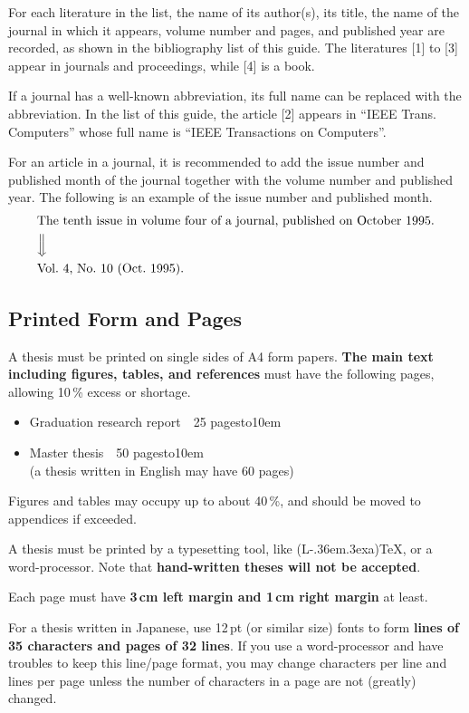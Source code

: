 \documentclass[master,english]{kuisthesis}
\def\LATEX{{\rm (L\kern-.36em\raise.3ex\hbox{\sc a})\TeX}}
\let\EM\bf
\begin{document}
For each literature in the list, the name of its author(s), its title, the
name of the journal in which it appears, volume number and pages, and
published year are recorded, as shown in the bibliography list of this guide.
The literatures [1] to [3] appear in journals and proceedings, while [4] is
a book.

If a journal has a well-known abbreviation, its full name can be replaced
with the abbreviation.  In the list of this guide, the article [2]
appears in ``IEEE Trans. Computers'' whose full name is ``IEEE Transactions
on Computers''.

For an article in a journal, it is recommended to add the issue number and
published month of the journal together with the volume number and published
year.  The following is an example of the issue number and published month.
\begin{eqnarray*}
&\hbox{The tenth issue in volume four of a journal, published on October 1995.}
\\
&\Big\Downarrow\\
&\hbox{Vol.~4, No.~10 (Oct.~1995)}.
\end{eqnarray*}

\subsection{Printed Form and Pages}\label{subsec-format}
A thesis must be printed on single sides of A4 form papers.  {\EM The main
text including figures, tables, and references} must have the following
pages, allowing 10\,\% excess or shortage.
\begin{itemize}%
\item
Graduation research report\ \dotfill\ 25 pages\hbox to10em{}
\item
Master thesis\ \dotfill\ 50 pages\hbox to10em{}\\
\hbox{}\hfill(a thesis written in English may have 60 pages)
\end{itemize}%
Figures and tables may occupy up to about 40\,\%, and should be moved to
appendices if exceeded.

A thesis must be printed by a typesetting tool, like \LATEX, or a
word-processor.  Note that {\EM hand-written theses will not be accepted}.

Each page must have {\EM 3\,cm left margin and 1\,cm right margin} at least.

For a thesis written in Japanese, use 12\,pt (or similar size) fonts to form
{\EM lines of 35 characters and pages of 32 lines}.  If you use a
word-processor and have troubles to keep this line/page format, you may
change characters per line and lines per page unless the number of
characters in a page are not (greatly) changed.
\end{document}
